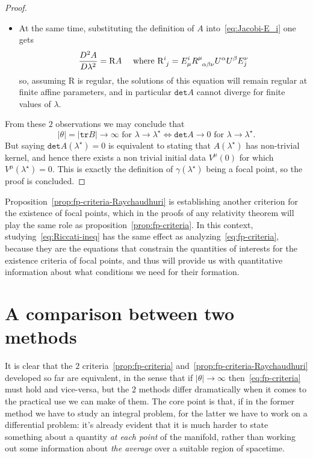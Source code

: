 \begin{proof}
\begin{itemize}
		\item[\ding{99}] At the same time, substituting the definition of \(A\) into~\eqref{eq:Jacobi-E_i} one gets
		\[
		\frac{D^2 A}{D\lambda^2} = \mathrm{R}A \quad \text{ where } \mathrm{R}\indices{^i_j} = E^i_{\mu}R\indices{^{\mu}_{\alpha\beta\nu}}U^{\alpha}U^{\beta}E_j^{\nu}
		\]
		so, assuming \(\mathrm{R}\) is regular, the solutions of this equation will remain regular at finite affine parameters, and in particular \(\texttt{det}A\) cannot diverge for finite values of \(\lambda\). 
	\end{itemize}
	From these \(2\) observations we may conclude that
	\[
	\vert\theta\vert = \vert\texttt{tr}B\vert \rightarrow \infty \text{ for } \lambda \rightarrow \lambda^{\star}\iff \texttt{det}A \rightarrow 0 \text{ for } \lambda \rightarrow \lambda^{\star}.
	\]
	But saying \(\texttt{det}A(\lambda^{\star}) = 0 \) is equivalent to stating that \(A(\lambda^{\star}) \) has non-trivial kernel, and hence there exists a non trivial initial data \(V^{\mu}(0)\) for which \(V^{\mu}(\lambda^{\star}) = 0\). This is exactly the definition of \(\gamma(\lambda^{\star})\) being a focal point, so the proof is concluded.
\end{proof}

Proposition~\ref{prop:fp-criteria-Raychaudhuri} is establishing another criterion for the existence of focal points, which in the proofs of any relativity theorem will play the same role as proposition~\ref{prop:fp-criteria}. In this context, studying~\ref{eq:Riccati-ineq} has the same effect as analyzing~\ref{eq:fp-criteria}, because they are the equations that constrain the quantities of interests for the existence criteria of focal points, and thus will provide us with quantitative information about what conditions we need for their formation.
	
\section{A comparison between two methods}
\label{sec:comparison-2-methods}
It is clear that the \(2\) criteria~\ref{prop:fp-criteria} and~\ref{prop:fp-criteria-Raychaudhuri} developed so far are equivalent, in the sense that if \(\vert\theta\vert \rightarrow \infty\) then~\eqref{eq:fp-criteria} must hold and vice-versa, but the \(2\) methods differ dramatically when it comes to the practical use we can make of them. The core point is that, if in the former method we have to study an integral problem, for the latter we have to work on a differential problem: it's already evident that it is much harder to state something about a quantity \emph{at each point} of the manifold, rather than working out some information about \emph{the average} over a suitable region of spacetime.
	
